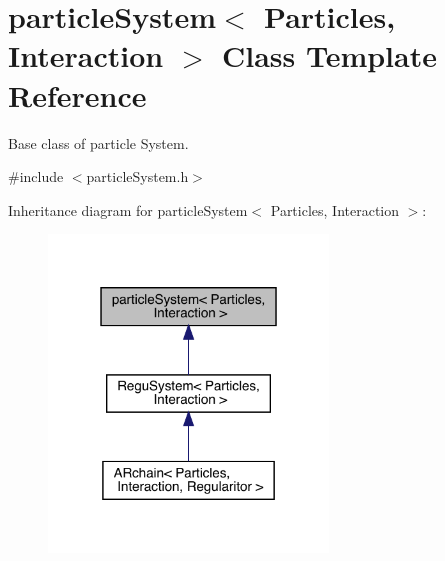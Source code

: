 \hypertarget{classparticle_system}{}\section{particle\+System$<$ Particles, Interaction $>$ Class Template Reference}
\label{classparticle_system}


Base class of particle System.  




{\ttfamily \#include $<$particle\+System.\+h$>$}



Inheritance diagram for particle\+System$<$ Particles, Interaction $>$\+:\nopagebreak
\begin{figure}[H]
\begin{center}
\leavevmode
\includegraphics[width=211pt]{classparticle_system__inherit__graph}
\end{center}
\end{figure}


